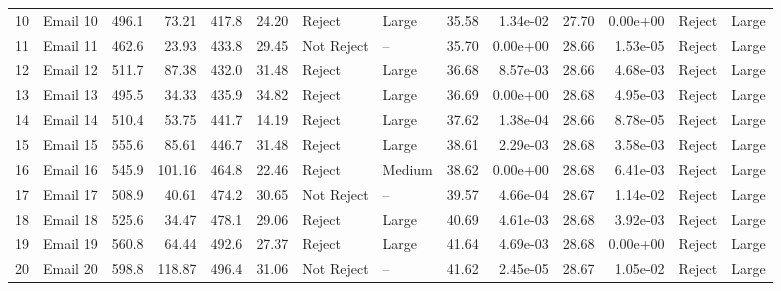 \begin{tabular}{llrrrrllrrrrll}
10 &  Email 10 &              496.1 &   73.21 &               417.8 &  24.20 &      Reject &       Large &                    35.58 &  1.34e-02 &                     27.70 &  0.00e+00 &  Reject &       Large \\
11 &  Email 11 &              462.6 &   23.93 &               433.8 &  29.45 &  Not Reject &          -- &                    35.70 &  0.00e+00 &                     28.66 &  1.53e-05 &  Reject &       Large \\
12 &  Email 12 &              511.7 &   87.38 &               432.0 &  31.48 &      Reject &       Large &                    36.68 &  8.57e-03 &                     28.66 &  4.68e-03 &  Reject &       Large \\
13 &  Email 13 &              495.5 &   34.33 &               435.9 &  34.82 &      Reject &       Large &                    36.69 &  0.00e+00 &                     28.68 &  4.95e-03 &  Reject &       Large \\
14 &  Email 14 &              510.4 &   53.75 &               441.7 &  14.19 &      Reject &       Large &                    37.62 &  1.38e-04 &                     28.66 &  8.78e-05 &  Reject &       Large \\
15 &  Email 15 &              555.6 &   85.61 &               446.7 &  31.48 &      Reject &       Large &                    38.61 &  2.29e-03 &                     28.68 &  3.58e-03 &  Reject &       Large \\
16 &  Email 16 &              545.9 &  101.16 &               464.8 &  22.46 &      Reject &      Medium &                    38.62 &  0.00e+00 &                     28.68 &  6.41e-03 &  Reject &       Large \\
17 &  Email 17 &              508.9 &   40.61 &               474.2 &  30.65 &  Not Reject &          -- &                    39.57 &  4.66e-04 &                     28.67 &  1.14e-02 &  Reject &       Large \\
18 &  Email 18 &              525.6 &   34.47 &               478.1 &  29.06 &      Reject &       Large &                    40.69 &  4.61e-03 &                     28.68 &  3.92e-03 &  Reject &       Large \\
19 &  Email 19 &              560.8 &   64.44 &               492.6 &  27.37 &      Reject &       Large &                    41.64 &  4.69e-03 &                     28.68 &  0.00e+00 &  Reject &       Large \\
20 &  Email 20 &              598.8 &  118.87 &               496.4 &  31.06 &  Not Reject &          -- &                    41.62 &  2.45e-05 &                     28.67 &  1.05e-02 &  Reject &       Large \\
\bottomrule
\end{tabular}
